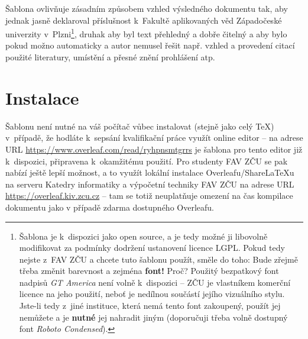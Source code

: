 \documentclass[czech, ma, kiv, he, iso690alph, pdf, viewonly]{fasthesis}
\begin{document}
Šablona ovlivňuje zásadním způsobem vzhled výsledného dokumentu tak, aby jednak jasně deklaroval příslušnost k~Fakultě aplikovaných věd Západočeské univerzity v~Plzni\footnote{Šablona je k~dispozici jako open source, a je tedy možné ji libovolně modifikovat za podmínky dodržení ustanovení licence LGPL. Pokud tedy nejste z~FAV ZČU a chcete tuto šablonu použít, směle do toho: Bude zřejmě třeba změnit barevnost a zejména \textbf{font!} Proč? Použitý bezpatkový font nadpisů \emph{GT America} není volně k~dispozici -- ZČU je vlastníkem komerční licence na jeho použití, neboť je nedílnou součástí jejího vizuálního stylu. Jste-li tedy z~jiné instituce, která nemá tento font zakoupený, použít jej nemůžete a je \textbf{nutné} jej nahradit jiným (doporučuji třeba volně dostupný font \emph{Roboto Condensed}).}, druhak aby byl text přehledný a dobře čitelný a aby bylo pokud možno  automaticky a autor nemusel řešit např. vzhled a provedení citací použité literatury, umístění a přesné znění prohlášení atp.
%
%
%
\section{Instalace}
Šablonu není nutné  na váš počítač vůbec instalovat (stejně jako celý \TeX) v~případě, že hodláte k~sepsání kvalifikační práce využít online editor  -- na adrese URL \url{https://www.overleaf.com/read/ryhpnsmtgrrs} je šablona pro tento editor již k~dispozici, připravena k~okamžitému použití. Pro studenty FAV ZČU se pak nabízí ještě lepší možnost, a to využít lokální instalace Overleafu/Share\LaTeX{}u na serveru Katedry informatiky a výpočetní techniky FAV ZČU na adrese URL \url{https://overleaf.kiv.zcu.cz} -- tam se totiž neuplatňuje omezení na čas kompilace dokumentu jako v případě zdarma dostupného Overleafu.
\end{document}
